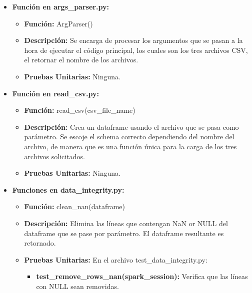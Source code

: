 \documentclass[a4paper]{article}
\begin{document}
\begin{itemize}
    \item \textbf{Funci\'{o}n en args\_parser.py:}
        \begin{itemize}
            \item \textbf{Funci\'{o}n:} ArgParser()
            \item \textbf{Descripci\'{o}n:} Se encarga de procesar los argumentos que se pasan a la hora de ejecutar el c\'{o}digo principal, los cuales son los tres archivos CSV, el retornar el nombre de los archivos.
            \item \textbf{Pruebas Unitarias:} Ninguna.
        \end{itemize}

    \item \textbf{Funci\'{o}n en read\_csv.py:}
        \begin{itemize}
            \item \textbf{Funci\'{o}n:} read\_csv(csv\_file\_name)
            \item \textbf{Descripci\'{o}n:} Crea un dataframe usando el archivo que se pasa como par\'{a}metro. Se escoje el schema correcto dependiendo del nombre del archivo, de manera que es una funci\'{o}n \'{u}nica para la carga de los tres archivos solicitados.
            \item \textbf{Pruebas Unitarias:} Ninguna.
        \end{itemize}

    \item \textbf{Funciones en data\_integrity.py:}
        \begin{itemize}
            \item \textbf{Funci\'{o}n:} clean\_nan(dataframe)
            \item \textbf{Descripci\'{o}n:} Elimina las l\'{i}neas que contengan NaN or NULL del dataframe que se pase por par\'{a}metro. El dataframe resultante es retornado.
            \item \textbf{Pruebas Unitarias:} En el archivo test\_data\_integrity.py:
                \begin{itemize}
                    \item \textbf{test\_remove\_rows\_nan(spark\_session):} Verifica que las l\'{i}neas con NULL sean removidas.
                \end{itemize}
        \end{itemize}


\end{itemize}
\end{document}
